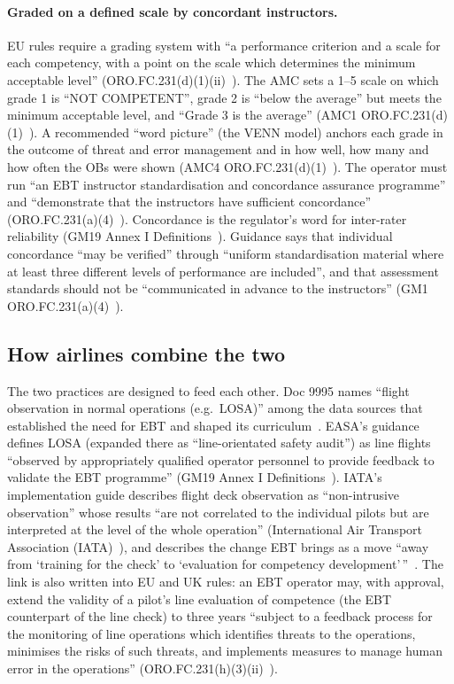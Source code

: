 \documentclass[11pt]{article}
\begin{document}
\paragraph{Graded on a defined scale by concordant instructors.} EU rules require a grading system with ``a performance criterion and a scale for each competency, with a point on the scale which determines the minimum acceptable level'' (ORO.FC.231(d)(1)(ii)~\cite{easa2026ear}). The AMC sets a 1--5 scale on which grade 1 is ``NOT COMPETENT'', grade 2 is ``below the average'' but meets the minimum acceptable level, and ``Grade 3 is the average'' (AMC1 ORO.FC.231(d)(1)~\cite{easa2026ear}). A recommended ``word picture'' (the VENN model) anchors each grade in the outcome of threat and error management and in how well, how many and how often the OBs were shown (AMC4 ORO.FC.231(d)(1)~\cite{easa2026ear}). The operator must run ``an EBT instructor standardisation and concordance assurance programme'' and ``demonstrate that the instructors have sufficient concordance'' (ORO.FC.231(a)(4)~\cite{easa2026ear}). Concordance is the regulator's word for inter-rater reliability (GM19 Annex I Definitions~\cite{easa2026ear}). Guidance says that individual concordance ``may be verified'' through ``uniform standardisation material where at least three different levels of performance are included'', and that assessment standards should not be ``communicated in advance to the instructors'' (GM1 ORO.FC.231(a)(4)~\cite{easa2026ear}).

\subsection{How airlines combine the two}\label{sec:combine}

The two practices are designed to feed each other. Doc 9995 names ``flight observation in normal operations (e.g.\ LOSA)'' among the data sources that established the need for EBT and shaped its curriculum~\cite[Part~I, 1.5]{icao2013ebt}. EASA's guidance defines LOSA (expanded there as ``line-orientated safety audit'') as line flights ``observed by appropriately qualified operator personnel to provide feedback to validate the EBT programme'' (GM19 Annex I Definitions~\cite{easa2026ear}). IATA's implementation guide describes flight deck observation as ``non-intrusive observation'' whose results ``are not correlated to the individual pilots but are interpreted at the level of the whole operation'' (International Air Transport Association (IATA)~\cite[2.11.3]{iata2024ebt}), and describes the change EBT brings as a move ``away from `training for the check' to `evaluation for competency development'\,''~\cite[3.2]{iata2024ebt}. The link is also written into EU and UK rules: an EBT operator may, with approval, extend the validity of a pilot's line evaluation of competence (the EBT counterpart of the line check) to three years ``subject to a feedback process for the monitoring of line operations which identifies threats to the operations, minimises the risks of such threats, and implements measures to manage human error in the operations'' (ORO.FC.231(h)(3)(ii)~\cite{easa2026ear}).
\end{document}
